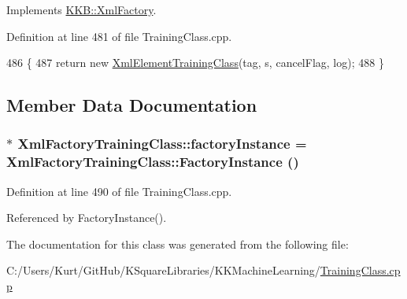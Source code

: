 Implements \hyperlink{class_k_k_b_1_1_xml_factory_a3f4b4f19dee1905e1758b16c66d0112a}{K\+K\+B\+::\+Xml\+Factory}.



Definition at line 481 of file Training\+Class.\+cpp.


\begin{DoxyCode}
486     \{
487       \textcolor{keywordflow}{return} \textcolor{keyword}{new} \hyperlink{namespace_k_k_m_l_l_a0f118c0155cb57cdd78c2bb6e7536353}{XmlElementTrainingClass}(tag, s, cancelFlag, log);
488     \}
\end{DoxyCode}


\subsection{Member Data Documentation}
\subsubsection[{\texorpdfstring{factory\+Instance}{factoryInstance}}]{ $\ast$ Xml\+Factory\+Training\+Class\+::factory\+Instance = {\bf Xml\+Factory\+Training\+Class\+::\+Factory\+Instance} ()\hspace{0.3cm}{\ttfamily [static]}}\hypertarget{class_xml_factory_training_class_a014c32143513655baa97e7f1441dd510}{}\label{class_xml_factory_training_class_a014c32143513655baa97e7f1441dd510}


Definition at line 490 of file Training\+Class.\+cpp.



Referenced by Factory\+Instance().



The documentation for this class was generated from the following file\+:\begin{DoxyCompactItemize}
\item 
C\+:/\+Users/\+Kurt/\+Git\+Hub/\+K\+Square\+Libraries/\+K\+K\+Machine\+Learning/\hyperlink{_training_class_8cpp}{Training\+Class.\+cpp}\end{DoxyCompactItemize}

